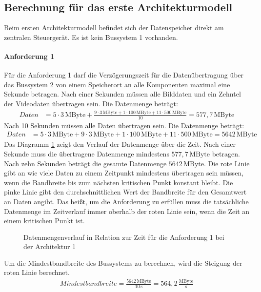 \subsection{Berechnung für das erste Architekturmodell}
Beim ersten Architekturmodell befindet sich der Datenspeicher direkt am zentralen Steuergerät. Es ist kein Bussystem 1 vorhanden.
\paragraph{Anforderung 1}
Für die Anforderung 1 darf die Verzögerungszeit für die Datenübertragung über das Bussystem 2 von einem Speicherort an alle Komponenten maximal eine Sekunde betragen. 
Nach einer Sekunden müssen alle Bilddaten und ein Zehntel der Videodaten übertragen sein. Die Datenmenge beträgt:
\begin{align}
	Daten &= 5 \cdot 3\,\mathrm{MByte} + \frac{9 \cdot 3 \,\mathrm{MByte} + 1 \cdot 100\,\mathrm{MByte} + 11 \cdot 500\,\mathrm{MByte}}{10} =  577,7\,\mathrm{MByte}
\end{align}
Nach 10 Sekunden müssen alle Daten übertragen sein. Die Datenmenge beträgt:
\begin{align}
	Daten &= 5 \cdot 3\,\mathrm{MByte} + 9 \cdot 3 \,\mathrm{MByte} + 1 \cdot 100\,\mathrm{MByte} + 11 \cdot 500\,\mathrm{MByte} =  5642\,\mathrm{MByte}
\end{align}
Das Diagramm \ref{fig:arch1anf1} zeigt den Verlauf der Datenmenge über die Zeit. Nach einer Sekunde muss die übertragene Datenmenge mindestens $ 577,7\,\mathrm{MByte} $ betragen. Nach zehn Sekunden beträgt die gesamte Datenmenge $ 5642\,\mathrm{MByte} $. Die rote Linie gibt an wie viele Daten zu einem Zeitpunkt mindestens übertragen sein müssen, wenn die Bandbreite bis zum nächsten kritischen Punkt konstant bleibt. Die pinke Linie gibt den durchschnittlichen Wert der Bandbreite für den Gesamtwert an Daten angibt. Das heißt, um die Anforderung zu erfüllen muss die tatsächliche Datenmenge im Zeitverlauf immer oberhalb der roten Linie sein, wenn die Zeit an einem kritischen Punkt ist.
\begin{figure}[]
	\centering
	
	\caption[Datenmengenverlauf in Relation zur Zeit für die Anforderung 1 bei der Architektur 1]{Datenmengenverlauf in Relation zur Zeit für die Anforderung 1 bei der Architektur 1}
	\label{fig:arch1anf1}
\end{figure}
Um die Mindestbandbreite des Bussystems zu berechnen, wird die Steigung der roten Linie berechnet.
\begin{align}
	Mindestbandbreite = \frac{5642\,\mathrm{MByte}}{10\,\mathrm{s}} = 564,2\,\frac{\mathrm{MByte}}{\mathrm{s}}
\end{align}
